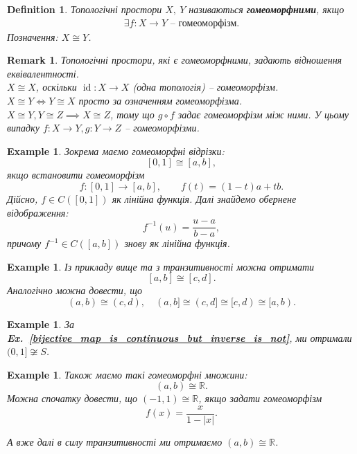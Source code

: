\documentclass[a4paper, 10pt]{article}
\theoremstyle{theoremdd}
\newtheorem{definition}[theorem]{Definition}
\newtheorem{example}[theorem]{Example}
\newtheorem{remark}[theorem]{Remark}
\newcommand\exref[1]{\textbf{Ex.~\ref{#1}}}
\DeclareMathOperator{\id}{id}
\begin{document}
\begin{definition}
Топологічні простори $X,\ Y$ називаються \textbf{гомеоморфними}, якщо
\begin{align*}
\exists f \colon X \to Y \text{ -- гомеоморфізм.}
\end{align*}
Позначення: $X \cong Y$.
\end{definition}

\begin{remark}
Топологічні простори, які є гомеоморфними, задають відношення еквівалентності.\\
$X \cong X$, оскільки $\id \colon X \to X$ (одна топологія) -- гомеоморфізм.\\
$X \cong Y \iff Y \cong X$ просто за означенням гомеоморфізма.\\
$X \cong Y, Y \cong Z \implies X \cong Z$, тому що $g \circ f$ задає гомеоморфізм між ними. У цьому випадку $f \colon X \to Y, g \colon Y \to Z$ -- гомеоморфізми.
\end{remark}

\begin{example}
Зокрема маємо гомеоморфні відрізки:
\[
[0,1] \cong [a,b],
\]
якщо встановити гомеоморфізм 
\[
f \colon [0,1] \to [a,b], \qquad f(t) = (1-t)a + tb.
\]
Дійсно, $f \in C([0,1])$ як лінійна функція. Далі знайдемо обернене відображення: 
\[
f^{-1}(u) = \dfrac{u-a}{b-a},
\]
причому $f^{-1} \in C([a,b])$ знову як лінійна функція.
\end{example}

\begin{example}
Із прикладу вище та з транзитивності можна отримати 
\[
[a,b] \cong [c,d].
\]
Аналогічно можна довести, що 
\[
(a,b) \cong (c,d), \quad (a,b] \cong (c,d] \cong [c,d) \cong [a,b).
\]
\end{example}

\begin{example}
За \exref{bijective_map_is_continuous_but_inverse_is_not}, ми отримали $(0,1] \not\cong S$.
\end{example}

\begin{example}
Також маємо такі гомеоморфні множини: 
\[
(a,b) \cong \mathbb{R}.
\] 
Можна спочатку довести, що $(-1,1) \cong \mathbb{R}$, якщо задати гомеоморфізм 
\[
f(x) = \dfrac{x}{1-|x|}.
\]
\begin{figure}[H]
\centering
{}
\end{figure}
\noindent
А вже далі в силу транзитивності ми отримаємо $(a,b) \cong \mathbb{R}$.
\end{example}
\end{document}

